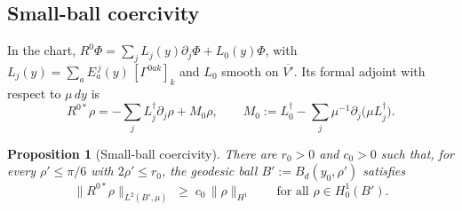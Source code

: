 \documentclass[11pt]{article}
\theoremstyle{plain}
\newtheorem{proposition}[theorem]{Proposition}
\theoremstyle{definition}
\theoremstyle{remark}
\begin{document}
\subsection{Small-ball coercivity}\label{sec:coer}

In the chart, $R^0\Phi = \sum_j L_j(y)\partial_j\Phi + L_0(y)\Phi$, with $L_j(y) = \sum_a E_a^{\,j}(y)\,[\Gamma^{0ak}]_k$ and $L_0$ smooth on $\overline{V'}$. Its formal adjoint with respect to $\mu\,dy$ is
\[
  R^{0*}\rho = -\sum_j L_j^\dagger\partial_j\rho + M_0\rho,
  \qquad
  M_0 := L_0^\dagger - \sum_j \mu^{-1}\partial_j\bigl(\mu L_j^\dagger\bigr).
\]

\begin{proposition}[Small-ball coercivity]\label{prop:coer}
There are $r_0 > 0$ and $c_0 > 0$ such that, for every $\rho' \le \pi/6$ with $2\rho' \le r_0$, the geodesic ball $B' := B_d(y_0,\rho')$ satisfies
\begin{equation}\label{eq:coer}
  \|R^{0*}\rho\|_{L^2(B',\mu)} \;\ge\; c_0\,\|\rho\|_{H^1}
  \qquad\text{for all } \rho \in H^1_0(B') .
\end{equation}
\end{proposition}
\end{document}
